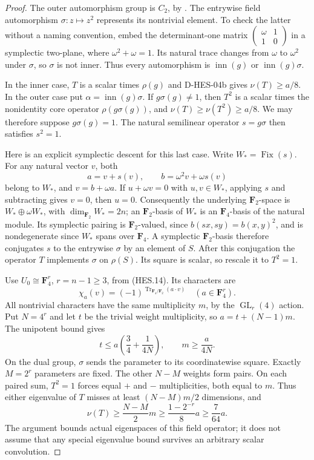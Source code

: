 \begin{proof}
The outer automorphism group is $C_2$, by
\cite[Section~2.2.2, Table~2.1, author p.~14]{HES:LiXia2022}.
The entrywise field automorphism $\sigma:z\mapsto z^2$ represents its
nontrivial element. To check the latter without a naming convention,
embed the determinant-one matrix
$\left(\begin{smallmatrix}\omega&1\\1&0\end{smallmatrix}\right)$
in a symplectic two-plane, where $\omega^2+\omega=1$.
Its natural trace changes from $\omega$ to $\omega^2$ under $\sigma$,
so $\sigma$ is not inner. Thus every automorphism is
$\operatorname{inn}(g)$ or $\operatorname{inn}(g)\sigma$.

In the inner case, $T$ is a scalar times $\rho(g)$ and D-HES-04b gives
$\nu(T)\ge a/8$. In the outer case put
$\alpha=\operatorname{inn}(g)\sigma$. If $g\sigma(g)\ne1$, then
$T^2$ is a scalar times the nonidentity core operator
$\rho(g\sigma(g))$, and
$\nu(T)\ge\nu(T^2)\ge a/8$. We may therefore suppose
$g\sigma(g)=1$. The natural semilinear operator $s=g\sigma$ then
satisfies $s^2=1$.

Here is an explicit symplectic descent for this last case. Write
$W_*=\operatorname{Fix}(s)$. For any natural vector $v$, both
\[
             a=v+s(v),\qquad b=\omega^2v+\omega s(v)
\]
belong to $W_*$, and $v=b+\omega a$. If $u+\omega v=0$ with
$u,v\in W_*$, applying $s$ and subtracting gives $v=0$, then $u=0$.
Consequently the underlying $\mathbf F_2$-space is
$W_*\oplus\omega W_*$, with $\dim_{\mathbf F_2}W_*=2n$; an
$\mathbf F_2$-basis of $W_*$ is an $\mathbf F_4$-basis of the natural
module. Its symplectic pairing is $\mathbf F_2$-valued, since
$b(sx,sy)=b(x,y)^2$, and is nondegenerate since $W_*$ spans over
$\mathbf F_4$. A symplectic $\mathbf F_2$-basis therefore conjugates
$s$ to the entrywise $\sigma$ by an element of $S$.
After this conjugation the operator $T$ implements $\sigma$ on $\rho(S)$.
Its square is scalar, so rescale it to $T^2=1$.

Use $U_0\cong\mathbf F_4^r$, $r=n-1\ge3$, from (HES.14).
Its characters are
\[
        \chi_a(v)=(-1)^{\operatorname{Tr}_{\mathbf F_4/\mathbf F_2}(a\cdot v)}
                         \quad(a\in\mathbf F_4^r).
\]
All nontrivial characters have the same multiplicity $m$, by the
$\operatorname{GL}_r(4)$ action. Put $N=4^r$ and let $t$ be the
trivial weight multiplicity, so $a=t+(N-1)m$. The unipotent bound gives
\[
 t\le a\left(\frac34+\frac1{4N}\right),
                 \qquad m\ge\frac{a}{4N}.
\tag{HES.21}
\]
On the dual group, $\sigma$ sends the parameter to its coordinatewise
square. Exactly $M=2^r$ parameters are fixed. The other $N-M$ weights
form pairs. On each paired sum, $T^2=1$ forces equal $+$ and $-$
multiplicities, both equal to $m$. Thus either eigenvalue of $T$ misses
at least $(N-M)m/2$ dimensions, and
\[
       \nu(T)\ge\frac{N-M}{2}m
            \ge\frac{1-2^{-r}}8a\ge\frac7{64}a.
\tag{HES.22}
\]
The argument bounds actual eigenspaces of this field operator; it does
not assume that any special eigenvalue bound survives an arbitrary
scalar convolution.
\end{proof}

